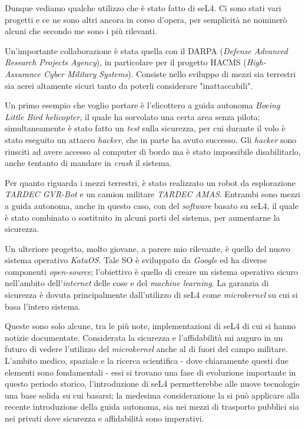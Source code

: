 Dunque vediamo qualche utilizzo che è stato fatto di seL4. Ci sono stati vari progetti e ce ne sono altri ancora in corso d'opera, per semplicità ne nominerò alcuni che secondo me sono i più rilevanti. 

Un'importante collaborazione è stata quella con il DARPA (\textit{Defense Advanced Research Projects Agency}), in particolare per il progetto HACMS (\textit{High-Assurance Cyber Military Systems}). Consiste nello sviluppo di mezzi sia terrestri sia aerei altamente sicuri tanto da poterli considerare "inattaccabili".

Un primo esempio che voglio portare è l'elicottero a guida autonoma \textit{Boeing Little Bird helicopter}, il quale ha sorvolato una certa area senza pilota; simultaneamente è stato fatto un \textit{test} sulla sicurezza, per cui durante il volo è stato eseguito un attacco \textit{hacker}, che in parte ha avuto successo. Gli \textit{hacker} sono riusciti ad avere accesso al computer di bordo ma è stato impossibile disabilitarlo, anche tentanto di mandare in \textit{crash} il sistema.

Per quanto riguarda i mezzi terrestri, è stato realizzato un robot da esplorazione \textit{TARDEC GVR-Bot} e un camion militare \textit{TARDEC AMAS}. Entrambi sono mezzi a guida autonoma, anche in questo caso, con del \textit{software} basato su seL4, il quale è stato combinato o sostituito in alcuni parti del sistema, per aumentarne la sicurezza.

Un ulteriore progetto, molto giovane, a parere mio rilevante, è quello del nuovo sistema operativo \textit{KataOS}. Tale SO è sviluppato da \textit{Google} ed ha diverse componenti \textit{open-source}; l'obiettivo è quello di creare un sistema operativo sicuro nell'ambito dell'\textit{internet} delle cose e del \textit{machine learning}. La garanzia di sicurezza è dovuta principalmente dall'utilizzo di seL4 come \textit{microkernel} su cui si basa l'intero sistema.

Queste sono solo alcune, tra le più note, implementazioni di seL4 di cui si hanno notizie documentate. Considerata la sicurezza e l'affidabilità mi auguro in un futuro di vedere l'utilizzo del \textit{microkernel} anche al di fuori del campo militare. L'ambito medico, spaziale e la ricerca scientifica - dove chiaramente questi due elementi sono fondamentali - essi si trovano una fase di evoluzione importante in questo periodo storico, l'introduzione di seL4 permetterebbe alle nuove tecnologie una base solida su cui basarsi; la medesima considerazione la si può applicare alla recente introduzione della guida autonoma, sia nei mezzi di trasporto pubblici sia nei privati dove sicurezza e affidabilità sono imperativi.
\newpage

